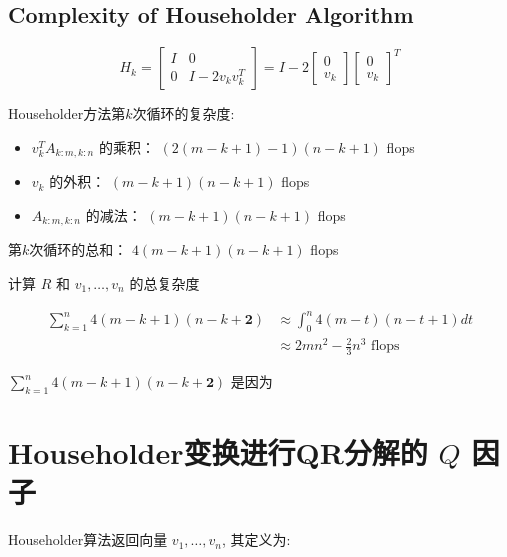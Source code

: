 \subsection{Complexity of Householder Algorithm}

\begin{equation} H_{k}=\left[\begin{array}{cc}I & 0 \\ 0 & I-2 v_{k} v_{k}^{T}\end{array}\right]=I-2\left[\begin{array}{c}0 \\ v_{k}\end{array}\right]\left[\begin{array}{l}0 \\ v_{k}\end{array}\right]^{T} \end{equation}

Householder方法第$k$次循环的复杂度:

\begin{itemize}
    \item $ v_{k}^{T} A_{k: m, k: n} $ 的乘积： $ (2({m}-{k}+1)-1)({n}-{k}+1) $ flops
    \item $ v_{k} $ 的外积： $ (m-k+1)(n-k+1) $ flops
    \item $ A_{k: m, k: n} $ 的减法： $ ({m}-{k}+1)({n}-{k}+1) $ flops
\end{itemize}

第$k$次循环的总和： $ 4({m}-{k}+1)({n}-{k}+1) $ flops

计算 $ R $ 和 $ v_{1}, \ldots, v_{n} $ 的总复杂度

\begin{equation} \begin{aligned} \sum_{k=1}^{n} 4(m-k+1)(n-k+\boldsymbol{2}) & \approx \int_{0}^{n} 4(m-t)(n-t+1) d t \\ & \approx 2 m n^{2}-\frac{2}{3} n^{3} \text { flops } \end{aligned} \end{equation}

\begin{remark}
    $\sum_{k=1}^{n} 4(m-k+1)(n-k+\boldsymbol{2})$ 是因为
\end{remark}

\section{Householder变换进行QR分解的 $Q$ 因子}

Householder算法返回向量 $ v_{1}, \ldots, v_{n} $, 其定义为:

